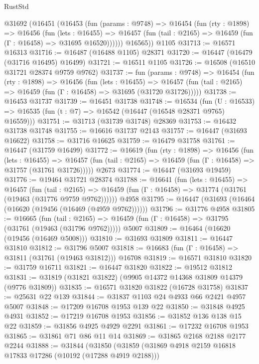 \begin{lexlean}{RustStd}
\begin{coremodule}
    @31692
      (@16451
        (@16453
          (fun (params : @9748) =>
          @16454
            (fun (rty : @1898) =>
            @16456
              (fun (lets : @16455) =>
              @16457 (fun (tail : @2165) => @16459 (fun (Γ : @16458) => @31695 @16520))))))
        @16565))
    @1105
@31713 := @16571 @16313
@31716 := @16487 (@16488 @1105) @28371
@31720 := @16447 (@16479 (@31716 @16495) @16499)
@31721 := @16511 @1105
@31726 := @16508 (@16510 @31721 @28374 @9759 @9762)
@31737 := fun (params : @9748) =>
  @16454
    (fun (rty : @1898) =>
    @16456
      (fun (lets : @16455) =>
      @16457 (fun (tail : @2165) => @16459 (fun (Γ : @16458) => @31695 (@31720 @31726)))))
@31738 := @16453 @31737
@31739 := @16451 @31738
@31748 := @16534
    (fun (U : @16533) => @16535 (fun (t : @7) => @16542 (@16447 (@16548 @28371 @9765) @16559)))
@31751 := @31713 (@31739 @31748) @28369
@31753 := @16432 @31738 @31748
@31755 := @16616 @31737 @2143
@31757 := @16447 (@31693 @16622)
@31758 := @31716 @16625
@31759 := @16479 @31758
@31761 := @16447 (@31759 @16499)
@31772 := @16619
    (fun (rty : @1898) =>
    @16456
      (fun (lets : @16455) =>
      @16457 (fun (tail : @2165) => @16459 (fun (Γ : @16458) => @31757 (@31761 @31726)))))
    @2673
@31774 := @16447 (@31693 @19459)
@31776 := @19464 @31721 @28374
@31788 := @16641
    (fun (lets : @16455) =>
    @16457
      (fun (tail : @2165) =>
      @16459 (fun (Γ : @16458) => @31774 (@31761 (@19463 (@31776 @9759 @9762))))))
    @4958
@31795 := @16447 (@31693 (@16464 (@16620 (@19456 (@16469 (@4959 @9762))))))
@31796 := @31776 @4958
@31805 := @16665
    (fun (tail : @2165) => @16459 (fun (Γ : @16458) => @31795 (@31761 (@19463 (@31796 @9762)))))
    @5007
@31809 := @16464 (@16620 (@19456 (@16469 @5008)))
@31810 := @31693 @31809
@31811 := @16447 @31810
@31812 := @31796 @5007
@31818 := @16683 (fun (Γ : @16458) => @31811 (@31761 (@19463 @31812))) @16708
@31819 := @16571 @31810
@31820 := @31759 @16711
@31821 := @16447 @31820
@31822 := @19512 @31812
@31831 := @31819 (@31821 @31822) (@9905 @14372 @14368 @31809 @14379 (@9776 @31809))
@31835 := @16571 @31820 @31822 (@16728 @31758)
@31837 := @25631 @22 @139
@31844 := @31837 @1103 @24 @4933 @66 @2421 @4957 @5007
@31848 := @17209 @16708 @1953 @139 @22
@31850 := @31848 @4925 @4931
@31852 := @17219 @16708 @1953
@31856 := @31852 @136 @138 @15 @22
@31859 := @31856 @4925 @4929 @2291
@31861 := @17232 @16708 @1953
@31865 := @31861 @71 @86 @11 @14
@31869 := @31865 @2168 @2188 @2177 @2244
@31888 := @31844
    (@31850
      (@31859
        (@31869 @4918 @2159 @16818 @17833 @17286 (@10192 (@17288 @4919 @2188)))

\end{coremodule}
\end{lexlean}
